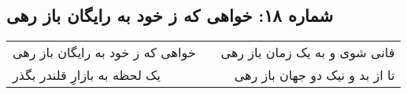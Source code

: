 \begin{center}
\section*{شماره ۱۸: خواهی که ز خود به رایگان باز رهی}
\label{sec:018}
\begin{longtable}{l p{0.5cm} r}
خواهی که ز خود به رایگان باز رهی
&&
فانی شوی و به یک زمان باز رهی
\\
یک لحظه به بازارِ قلندر بگذر
&&
تا از بد و نیک دو جهان باز رهی
\\
\end{longtable}
\end{center}
